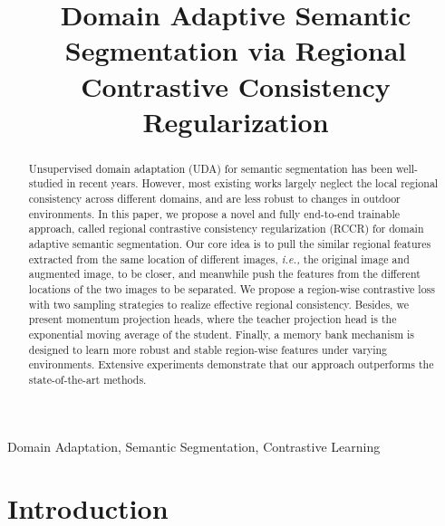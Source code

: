 \documentclass{article}
\begin{document}
\sloppy



\def\x{{\mathbf x}}
\def\L{{\cal L}}


\title{Domain Adaptive Semantic Segmentation via Regional Contrastive Consistency Regularization}


\address{$^{1}$ Shanghai Jiao Tong University $^{2}$Deakin University \\ \{zhouqianyu,fallen,ranyi\}@sjtu.edu.cn,  xuequan.lu@deakin.edu.au, ma-lz@cs.sjtu.edu.cn}


\maketitle


\begin{abstract}
Unsupervised domain adaptation (UDA) for semantic segmentation has been well-studied in recent years. However, most existing works largely neglect the local regional consistency across different domains, and are less robust to changes in outdoor environments. In this paper, we propose a novel and fully end-to-end trainable approach, called regional contrastive consistency regularization (RCCR) for domain adaptive semantic segmentation. Our core idea is to pull the similar regional features extracted from the same location of different images, \emph{i.e.,} the original image and augmented image, to be closer, and meanwhile push the features from the different locations of the two images to be separated. We propose a region-wise contrastive loss with two sampling strategies to realize effective regional consistency. Besides, we present momentum projection heads, where the teacher projection head is the exponential moving average of the student. Finally, a memory bank mechanism is designed to learn more robust and stable region-wise features under varying environments. Extensive experiments demonstrate that our approach outperforms the state-of-the-art methods.
\end{abstract}
\begin{keywords}
Domain Adaptation, Semantic Segmentation, Contrastive Learning
\end{keywords}


\section{Introduction}
\end{document}
